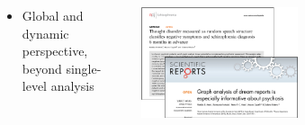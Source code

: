 \begin{minipage}[t]{\textwidth}
    \begin{columns}
        \begin{column}{0.5\textwidth}
        \begin{itemize}
            \item Global and dynamic perspective, beyond single-level analysis
        \end{itemize}
        \end{column}
    \begin{column}{0.5\textwidth}
        \centering
        \includegraphics[width=0.5\textwidth]{immagini/paper_2}
        \vspace{0.2cm}
    \end{column}
\end{columns}
\end{minipage}
